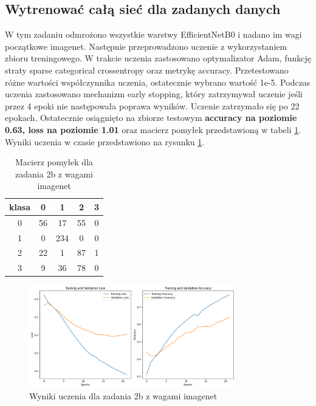 
\subsection{Wytrenować całą sieć dla zadanych danych}
W tym zadaniu odmrożono wszystkie warstwy EfficientNetB0 i nadano im wagi początkowe imagenet. Następnie przeprowadzono uczenie z wykorzystaniem zbioru treningowego. W trakcie uczenia zastosowano optymalizator Adam, funkcję straty sparse categorical crossentropy oraz metrykę accuracy. Przetestowano różne wartości współczynnika uczenia, ostatecznie wybrano wartość 1e-5. Podczas uczenia zastosowano mechanizm early stopping, który zatrzymywał uczenie jeśli przez 4 epoki nie następowała poprawa wyników. Uczenie zatrzymało się po 22 epokach. Ostatecznie osiągnięto na zbiorze testowym \textbf{accuracy na poziomie 0.63, loss na poziomie 1.01} oraz macierz pomyłek przedstawioną w tabeli \ref{tab:z2b}. Wyniki uczenia w czasie przedstawiono na rysunku \ref{fig:z2b_with_w}.


\begin{table}[H]
\centering
\begin{tabular}{|c|c|c|c|c|}
\hline
klasa  & 0 & 1 & 2 & 3 \\ \hline
0 & 56 & 17 & 55 & 0 \\ \hline
1 & 0 & 234 & 0 & 0 \\ \hline
2 & 22 & 1 & 87 & 1 \\ \hline
3 & 9 & 36 & 78 & 0 \\ \hline
\end{tabular}
\caption{Macierz pomyłek dla zadania 2b z wagami imagenet}
\label{tab:z2b}
\end{table}
    
\begin{figure}[H]
    \centering
    \includegraphics[width=0.8\textwidth]{img/z2b_with_w.png}
    \caption{Wyniki uczenia dla zadania 2b z wagami imagenet}
    \label{fig:z2b_with_w}
\end{figure}

